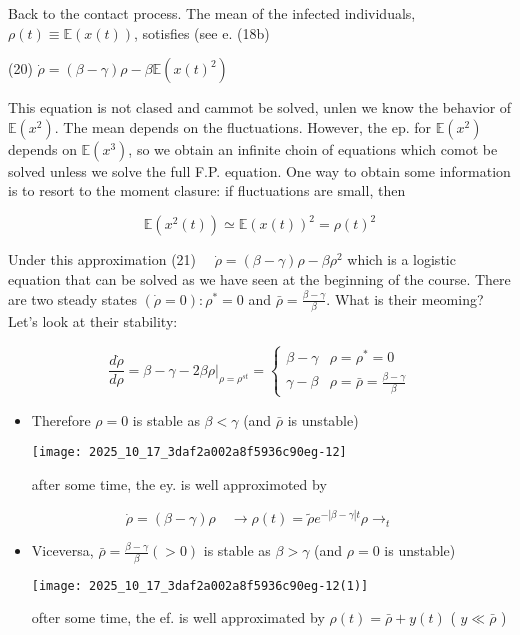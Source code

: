 Back to the contact process.
The mean of the infected individuals, $\rho(t) \equiv \mathbb{E}(x(t))$, sotisfies (see e. (18b)

(20) $\dot{\rho}=(\beta-\gamma) \rho-\beta \mathbb{E}\left(x(t)^{2}\right)$

This equation is not clased and cammot be solved, unlen we know the behavior of $\mathbb{E}\left(x^{2}\right)$. The mean depends on the fluctuations. However, the ep. for $\mathbb{E}\left(x^{2}\right)$ depends on $\mathbb{E}\left(x^{3}\right)$, so we obtain an infinite choin of equations which comot be solved unless we solve the full F.P. equation.
One way to obtain some information is to resort to the moment clasure: if fluctuations are small, then

$$ 
\mathbb{E}\left(x^{2}(t)\right) \simeq \mathbb{E}(x(t))^{2}=\rho(t)^{2}
$$ 

Under this approximation
(21) $\quad \dot{\rho}=(\beta-\gamma) \rho-\beta \rho^{2}$
which is a logistic equation that can be solved as we have seen at the beginning of the course.
There are two steady states $(\dot{\rho}=0): \rho^{*}=0$ and $\bar{\rho}=\frac{\beta-\gamma}{\beta}$. What is their meoming?
Let's look at their stability:

$$ 
\frac{d \dot{\rho}}{d \rho}=\beta-\gamma-\left.2 \beta \rho\right|_{\rho=\rho^{s t}}=\left\{\begin{array}{cc}
\beta-\gamma & \rho=\rho^{*}=0 \\ \gamma-\beta & \rho=\bar{\rho}=\frac{\beta-\gamma}{\beta}\end{array}\right.
$$ 

\begin{itemize}
  \item Therefore $\rho=0$ is stable as $\beta<\gamma$ (and $\bar{\rho}$ is unstable)
\begin{center}
\texttt{[image: 2025\_10\_17\_3daf2a002a8f5936c90eg-12]}
\end{center}
after some time, the ey. is well approximoted by
\end{itemize}

$$ 
\dot{\rho}=(\beta-\gamma) \rho \quad \rightarrow \rho(t)=\tilde{\rho} e^{-|\beta-\gamma| t} \rho \rightarrow_{t}
$$ 

\begin{itemize}
  \item Viceversa, $\bar{\rho}=\frac{\beta-\gamma}{\beta}(>0)$ is stable as $\beta>\gamma$ (and $\rho=0$ is unstable)
\begin{center}
\texttt{[image: 2025\_10\_17\_3daf2a002a8f5936c90eg-12(1)]}
\end{center}
ofter some time, the ef. is well approximated by $\rho(t)=\bar{\rho}+y(t)$ ( $y \ll \bar{\rho}$ )
\end{itemize}

